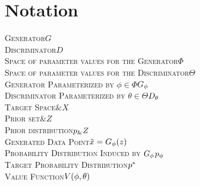 \section{Notation}
\vspace{3cm}
\begin{center}
  \begin{minipage}[c]{0.8\linewidth}
    \begin{center}
      \scshape
      Generator\dotfill $G$ \\
      Discriminator\dotfill $D$ \\
      Space of parameter values for the Generator\dotfill $\Phi$ \\
      Space of parameter values for the Discriminator\dotfill $\Theta$ \\
      Generator Parameterized by $\phi \in \Phi$\dotfill $G_\phi$ \\
      Discriminator Parameterized by $\theta \in \Theta$\dotfill $D_\theta$ \\
      Target Space\dotfill $\&X$ \\
      Prior set\dotfill $\&Z$ \\
      Prior distribution\dotfill $p_\&Z$ \\
      Generated Data Point\dotfill $\tilde{x} = G_\phi(z)$ \\
      Probability Distribution Induced by $G_\phi$\dotfill $p_{\phi}$ \\
      Target Probability Distribution\dotfill $p^*$ \\
      Value Function\dotfill $V(\phi, \theta)$ \\
    \end{center}
  \end{minipage}
\end{center}

